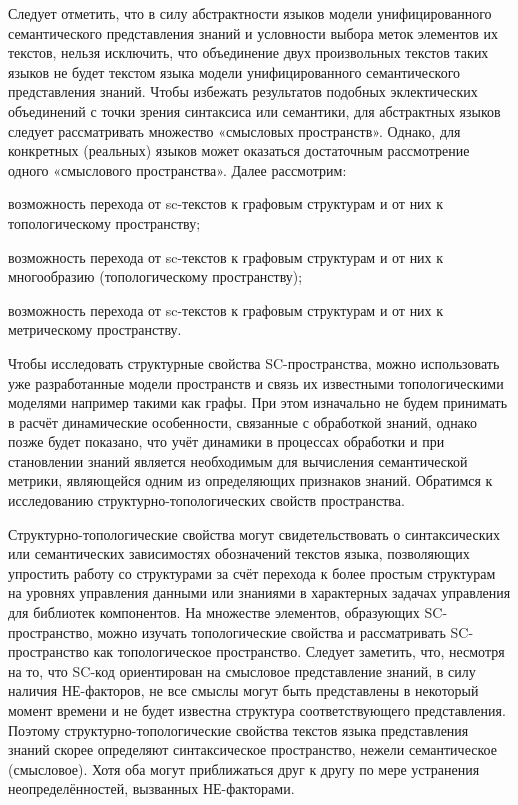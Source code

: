 Следует отметить, что в силу абстрактности языков модели унифицированного семантического представления знаний и условности выбора меток элементов их текстов, нельзя исключить, что объединение двух произвольных текстов таких языков не будет текстом языка модели унифицированного семантического представления знаний. Чтобы избежать результатов подобных эклектических объединений с точки зрения синтаксиса или семантики, для абстрактных языков следует рассматривать множество «смысловых пространств». Однако, для конкретных (реальных) языков может оказаться достаточным рассмотрение одного «смыслового пространства».
Далее рассмотрим:
\begin{scnitemize}
	\item возможность перехода от sc-текстов к графовым структурам и от них к топологическому пространству;
	\item возможность перехода от sc-текстов к графовым структурам и от них к многообразию (топологическому пространству);
	\item возможность перехода от sc-текстов к графовым структурам и от них к метрическому пространству.
\end{scnitemize}
Чтобы исследовать структурные свойства SC-пространства, можно использовать уже разработанные модели пространств и связь их известными топологическими моделями например такими как графы. При этом изначально не будем принимать в расчёт динамические особенности, связанные с обработкой знаний, однако позже будет показано, что учёт динамики в процессах обработки и при становлении знаний является необходимым для вычисления семантической метрики, являющейся одним из определяющих признаков знаний.
Обратимся к исследованию структурно-топологических свойств пространства.

Структурно-топологические свойства могут свидетельствовать о синтаксических или семантических зависимостях обозначений текстов языка, позволяющих упростить работу со структурами за счёт перехода к более простым структурам на уровнях управления данными или знаниями в характерных задачах управления для библиотек компонентов.
На множестве элементов, образующих SC-пространство, можно изучать топологические свойства и рассматривать SC-пространство как топологическое пространство. Следует заметить, что, несмотря на то, что SC-код ориентирован на смысловое представление знаний, в силу наличия НЕ-факторов, не все смыслы могут быть представлены в некоторый момент времени и не будет известна структура соответствующего представления. Поэтому структурно-топологические свойства текстов языка представления знаний скорее определяют синтаксическое пространство, нежели семантическое (смысловое). Хотя оба могут приближаться друг к другу по мере устранения неопределённостей, вызванных НЕ-факторами.

